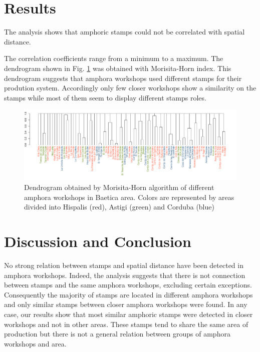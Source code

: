 \documentclass[review]{elsarticle}
\begin{document}

\section{Results}

The analysis shows that amphoric stamps could not be correlated with spatial distance. 

The correlation coefficients range from a minimum to a maximum. The dendrogram shown in Fig. \ref{dendro} was obtained with Morisita-Horn index. This dendrogram suggests that amphora workshops used different stamps for their prodution system. Accordingly only few closer workshops show a similarity on the stamps while most of them seem to display different stamps roles. 

\begin{figure}[htp]
	\centering
\includegraphics[width=\linewidth]{figs/dendro}
\caption{Dendrogram obtained by Morisita-Horn algorithm of different amphora workshops in Baetica area. Colors are represented by areas divided into Hispalis (red), Astigi (green) and Corduba (blue)}
\label{dendro}
\end{figure} 





\section{Discussion and Conclusion}

No strong relation between stamps and spatial distance have been detected in amphora workshops. Indeed, the analysis suggests that there is not connection between stamps and the same amphora workshops, excluding certain exceptions. Consequently the majority of stamps are located in different amphora workshops and only similar stamps between closer amphora workshops were found. In any case, our results show that most similar amphoric stamps were detected in closer workshops and not in other areas. These stamps tend to share the same area of production but there is not a general relation between groups of amphora workshops and area. 
\end{document}

